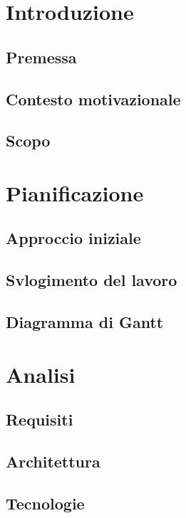 \documentclass[twoside]{supsistudent}
\begin{document}
\chapter{Introduzione}

\section{Premessa}

\section{Contesto motivazionale}

\section{Scopo}

\chapter{Pianificazione}

\section{Approccio iniziale}

\section{Svlogimento del lavoro}

\section{Diagramma di Gantt}

\chapter{Analisi}

\section{Requisiti}

\section{Architettura}

\section{Tecnologie}
\end{document}
